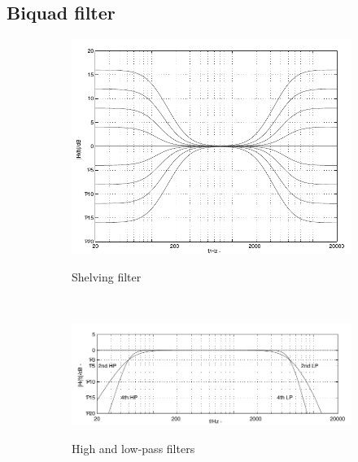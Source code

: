 \documentclass[a4paper,twoside,12pt]{book}
\begin{document}
\subsection{Biquad filter}
\begin{figure}[H]
    \centering
    \begin{subfigure}[t]{0.25\textwidth}
        \includegraphics[width=\textwidth]{images/filter_shelving}
        \label{fig:shelf}
        \caption{Shelving filter}
    \end{subfigure}
    ~
    \begin{subfigure}[t]{0.45\textwidth}
        \includegraphics[width=\textwidth]{images/filter_pass}
        \label{fig:pass}
        \caption{High and low-pass filters}
    \end{subfigure}
    ~
    \begin{subfigure}[t]{0.25\textwidth}

\end{subfigure}
\end{figure}
\end{document}
